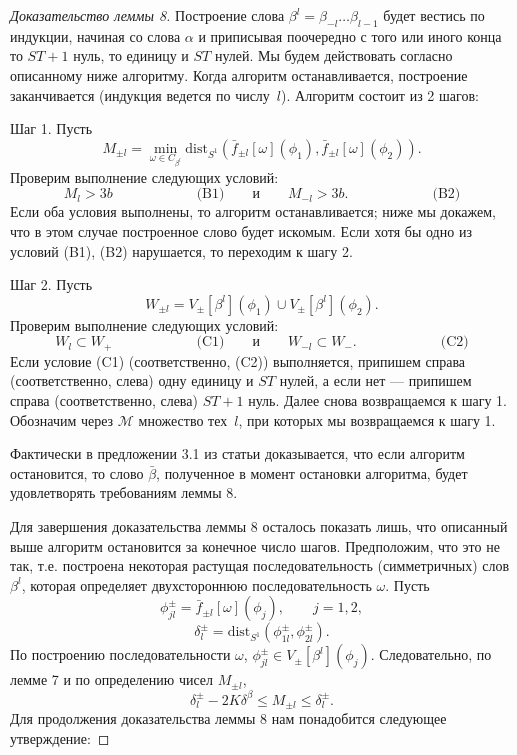 \documentclass[12pt]{article}
\begin{document}
\begin{proof}[Доказательство леммы 8] 
Построение слова $\beta^l=\beta_{-l}\ldots\beta_{l-1}$ будет вестись по индукции,
 начиная со слова $\alpha$ и приписывая поочередно с того или иного конца то $ST+1$ нуль, то единицу и $ST$ нулей. Мы будем действовать согласно описанному ниже алгоритму. Когда алгоритм останавливается, построение заканчивается (индукция ведется по числу~$l$). Алгоритм состоит из 2 шагов: 
 
Шаг 1. Пусть
$$M_{\pm l}=\min_{\omega\in C_{\beta^l}}\mbox{dist}_{S^1}(\bar{f}_{\pm l}[\omega](\phi_1),\bar{f}_{\pm l}[\omega](\phi_2)).$$
Проверим выполнение следующих условий:
$$M_l>3b\qquad\qquad\qquad\textrm{(B1)}\qquad\textrm{и}\qquad M_{-l}>3b.\qquad\qquad\qquad\textrm{(B2)}$$
Если оба условия выполнены, то алгоритм останавливается; ниже мы докажем, что в этом случае построенное слово будет искомым. Если хотя бы одно из условий (B1), (B2) нарушается, то переходим к шагу 2.

Шаг 2. Пусть
$$W_{\pm l}=V_{\pm}[\beta^l](\phi_1)\cup V_{\pm}[\beta^l](\phi_2).$$
Проверим выполнение следующих условий:
$$W_l\subset W_+\qquad\qquad\qquad\textrm{(C1)}\qquad\textrm{и}\qquad W_{-l}\subset W_-.\qquad\qquad\qquad\textrm{(C2)}$$
Если условие (C1) (соответственно, (C2)) выполняется, припишем справа (соответственно, слева) одну единицу и $ST$ нулей, а если нет --- припишем справа (соответственно, слева) $ST+1$ нуль. Далее снова возвращаемся к шагу 1. Обозначим через $\mathcal M$ множество тех~$l$, при которых мы возвращаемся к шагу 1.

Фактически в предложении 3.1 из статьи \cite{17} доказывается, что если алгоритм остановится, то
слово $\bar{\beta}$, полученное в момент остановки алгоритма, будет удовлетворять требованиям леммы 8.

Для завершения доказательства леммы 8 осталось показать лишь, что описанный выше алгоритм остановится за конечное число шагов. Предположим, что это не так, т.е. построена некоторая растущая последовательность (симметричных) слов $\beta^l$, которая определяет двухстороннюю последовательность $\omega$. Пусть
$$\phi^{\pm}_{jl}=\bar{f}_{\pm l}[\omega](\phi_j),\qquad j=1,2,$$
$$\delta^{\pm}_l=\mbox{dist}_{S^1}(\phi^{\pm}_{1l},\phi^{\pm}_{2l}).$$
По построению последовательности $\omega$, $\phi^{\pm}_{jl}\in V_{\pm}[\beta^l](\phi_j)$. Следовательно, по лемме 7 и по определению чисел $M_{\pm l}$,
$$\delta^{\pm}_{l}-2K\delta^{\beta}\leq M_{\pm l}\leq\delta^{\pm}_l.$$
Для продолжения доказательства леммы 8 нам понадобится следующее утверждение:


\end{proof}
\end{document}
